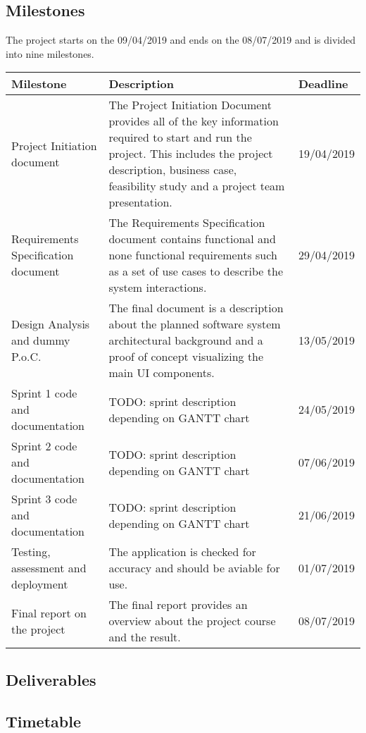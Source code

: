 \documentclass[notitlepage]{article}
\begin{document}
\begin{flushleft}
\subsection{Milestones}
The project starts on the 09/04/2019 and ends on the 08/07/2019 and is divided into nine milestones.  
\begin{center}
  \begin{tabular}{  m{6cm} m{8cm} m{2cm} }
  	\hline
		Milestone & Description & Deadline \\ \hline
		Project Initiation document & The Project Initiation Document provides all of the key information required to start and run the project. This includes the project description, business case, feasibility study and a project team presentation.  & 19/04/2019 \\ \hline
		Requirements Specification document & The Requirements Specification document contains functional and none functional requirements such as a set of use cases to describe the system interactions. & 29/04/2019 \\ \hline
		Design Analysis and dummy P.o.C. & The final document is a description about the planned software system architectural background and a proof of concept visualizing the main UI components. & 13/05/2019 \\ \hline
		Sprint 1 code and documentation & {\color{red} TODO: sprint description depending on GANTT chart}  & 24/05/2019 \\ \hline
		Sprint 2 code and documentation & {\color{red} TODO: sprint description depending on GANTT chart} & 07/06/2019 \\ \hline
		Sprint 3 code and documentation & {\color{red} TODO: sprint description depending on GANTT chart} & 21/06/2019 \\ \hline
		Testing, assessment and deployment & The application is checked for accuracy and should be aviable for use. & 01/07/2019 \\ \hline
		Final report on the project & The final report provides an overview about the project course and the result. & 08/07/2019 \\ \hline
	\end{tabular}
\end{center}
\subsection{Deliverables}

\subsection{Timetable}


\end{flushleft}
\end{document}
